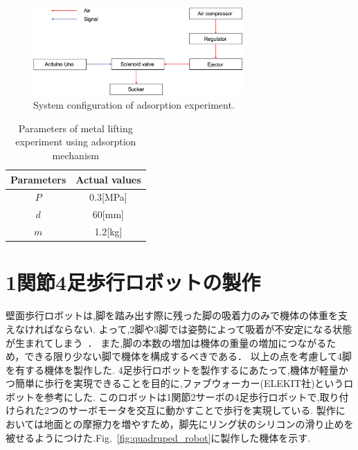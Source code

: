 \documentclass[uplatex,dvipdfmx]{jlreq}
\begin{document}

\begin{figure}
    \centering
    \includegraphics[width=80mm]{./figure/System_configuration_of_adsorption_experiments.png}
    \caption{System configuration of adsorption experiment.}
    \label{fig:System configuration for adsorption experiments}
\end{figure}

\begin{table}
    \caption{Parameters of metal lifting experiment using adsorption mechanism}
     \label{table:parameters}
     \centering
     \begin{tabular}{cc}\hline
      Parameters & Actual values \\ \hline 
     $P$ & 0.3[MPa]\\ 
     $d$ & 60[mm]\\ 
     $m$ & 1.2[kg]\\\hline    
     \end{tabular}
  \end{table}

\section{1関節4足歩行ロボットの製作}
壁面歩行ロボットは,脚を踏み出す際に残った脚の吸着力のみで機体の体重を支えなければならない.
よって,2脚や3脚では姿勢によって吸着が不安定になる状態が生まれてしまう~\cite{広瀬茂男1991四足壁面移動ロボット}．
また,脚の本数の増加は機体の重量の増加につながるため，できる限り少ない脚で機体を構成するべきである．
以上の点を考慮して4脚を有する機体を製作した.
4足歩行ロボットを製作するにあたって,機体が軽量かつ簡単に歩行を実現できることを目的に,ファブウォーカー(ELEKIT社)というロボットを参考にした.
このロボットは1関節2サーボの4足歩行ロボットで,取り付けられた2つのサーボモータを交互に動かすことで歩行を実現している.
製作においては地面との摩擦力を増やすため，脚先にリング状のシリコンの滑り止めを被せるようにつけた.Fig.~\ref{fig:quadruped_robot}に製作した機体を示す.
\end{document}

